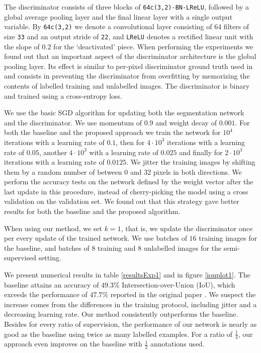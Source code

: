 \documentclass[a4paper]{article}
\begin{document}
The discriminator consists of three blocks of \texttt{64c(3,2)-BN-LReLU}, followed by a global average pooling layer and the final linear layer with a single output variable. By \texttt{64c(3,2)} we denote a convolutional layer consisting of 64 filters of size \texttt{3}\texttimes\texttt{3} and an output stride of  \texttt{2}\texttimes\texttt{2}, and \texttt{LReLU} denotes a rectified linear unit with the slope of $0.2$ for the `deactivated' piece.
When performing the experiments we found out that an important aspect of the discriminator architecture is the global pooling layer. Its effect is similar to per-pixel discriminator ground truth used in \cite{pix2pix2016} and consists in preventing the discriminator from overfitting by memorizing the contents of labelled training and unlabelled images. 
The discriminator is binary and trained using a cross-entropy loss.

We use the basic SGD algorithm for updating both the segmentation network and the discriminator. We use momentum of $0.9$ and weight decay of $0.001$. For both the baseline and the proposed approach we train the network for $10^4$ iterations with a learning rate of $0.1$, then for $4 \cdot 10^3$ iterations with a learning rate of $0.05$, another $4 \cdot 10^3$ with a learning rate of $0.025$ and finally for $2 \cdot 10^3$ iterations with a learning rate of $0.0125$. We jitter the training images by shifting them by a random number of between $0$ and $32$ pixels in both directions. We perform the accuracy tests on the network defined by the weight vector after the last update in this procedure, instead of cherry-picking the model using a cross validation on the validation set. We found out that this strategy gave better results for both the baseline and the proposed algorithm.

When using our method, we set $k=1$, that is, we update the discriminator once per every update of the trained network. We use batches of $16$ training images for the baseline, and batches of $8$ training and $8$ unlabelled images for the semi-supervised setting.

We present numerical results in table \ref{resultsExp1} and in figure \ref{iouplot1}. The baseline attains an accuracy of $49.3\%$ Intersection-over-Union (IoU), which exceeds the performance of $47.7\%$ reported in the original paper \cite{segnet}. We suspect the increase comes from the differences in the training protocol, including jitter and a decreasing learning rate. Our method consistently outperforms the baseline. Besides 
for every ratio of supervision, the performance 
of our network is nearly as good as the baseline using twice as many labelled examples. For a ratio of $\frac 14$, our approach even improves on the baseline with $\frac 12$ annotations used.
\end{document}
